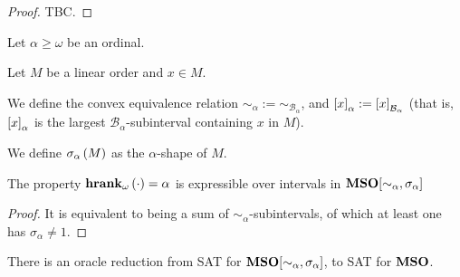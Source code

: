 \begin{proof}
  TBC.
\end{proof}

\begin{definition}
  Let $\alpha \ge \omega$ be an ordinal.

  Let $M$ be a linear order and $x \in M$.

  We define the convex equivalence relation $\sim_\alpha := \sim_{\mathcal{B}_{\alpha}}$,
  and $\left[ {x} \right]_{\alpha} := \left[ {x} \right]_{\mathcal{B}_{\alpha}}$ (that is,
  $\left[ {x} \right]_{\alpha}$ is the largest $\mathcal{B}_{\alpha}$-subinterval
  containing $x$ in $M$).

  We define $\sigma_{\alpha} \left( {M} \right)$ as 
  the $\alpha$-shape of $M$.
\end{definition}


\begin{lemma}
  The property
  $\mathbf{hrank}_{\omega}\left( \cdot \right) = \alpha$ is expressible over intervals
   in $\mathbf{MSO}[\sim_{\alpha}, \sigma_{\alpha}]$
\end{lemma}

\begin{proof}
  It is equivalent to being a sum of $\sim_{\alpha}$-subintervals,
  of which at least one has $\sigma_{\alpha} \ne 1$.
\end{proof}

\begin{theorem}
  There is an oracle reduction from SAT for $\mathbf{MSO}[\sim_{\alpha}, \sigma_{\alpha}]$,
  to SAT for $\mathbf{MSO}$.
\end{theorem}

